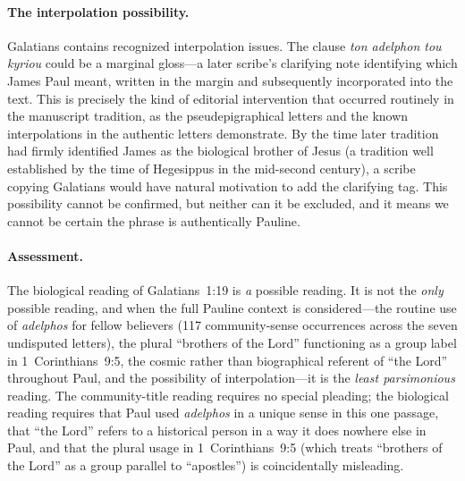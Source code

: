 \documentclass[12pt,oneside]{article}
\newcommand{\grk}[1]{\textit{#1}}   %
\begin{document}
\paragraph{The interpolation possibility.}
Galatians contains recognized interpolation issues.  The clause
\grk{ton adelphon tou kyriou} could be a marginal gloss---a later
scribe's clarifying note identifying which James Paul meant, written in
the margin and subsequently incorporated into the text.  This is
precisely the kind of editorial intervention that occurred routinely in
the manuscript tradition, as the pseudepigraphical letters and the
known interpolations in the authentic letters demonstrate.  By the time
later tradition had firmly identified James as the biological brother
of Jesus (a tradition well established by the time of Hegesippus in the
mid-second century), a scribe copying Galatians would have natural
motivation to add the clarifying tag.  This possibility cannot be
confirmed, but neither can it be excluded, and it means we cannot be
certain the phrase is authentically Pauline.

\paragraph{Assessment.}
The biological reading of Galatians~1:19 is \textit{a} possible
reading.  It is not the \textit{only} possible reading, and when the
full Pauline context is considered---the routine use of \grk{adelphos}
for fellow believers (117 community-sense occurrences across the seven
undisputed letters), the plural ``brothers of the Lord'' functioning as
a group label in 1~Corinthians~9:5, the cosmic rather than biographical
referent of ``the Lord'' throughout Paul, and the possibility of
interpolation---it is the \textit{least parsimonious} reading.  The
community-title reading requires no special pleading; the biological
reading requires that Paul used \grk{adelphos} in a unique sense in this
one passage, that ``the Lord'' refers to a historical person in a way it
does nowhere else in Paul, and that the plural usage in
1~Corinthians~9:5 (which treats ``brothers of the Lord'' as a group
parallel to ``apostles'') is coincidentally misleading.
\end{document}

